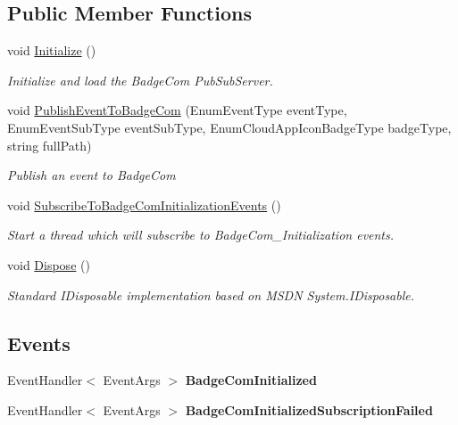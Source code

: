 \subsection*{Public Member Functions}
\begin{DoxyCompactItemize}
\item 
void \hyperlink{class_cloud_api_public_1_1_badge_n_e_t_1_1_badge_com_pub_sub_events_a1db23ca4b59065355bae07fb1754dc3c}{Initialize} ()
\begin{DoxyCompactList}\small\item\em Initialize and load the Badge\-Com Pub\-Sub\-Server. \end{DoxyCompactList}\item 
void \hyperlink{class_cloud_api_public_1_1_badge_n_e_t_1_1_badge_com_pub_sub_events_aff79f63ce7a5015fc8201d2f6c162ec1}{Publish\-Event\-To\-Badge\-Com} (Enum\-Event\-Type event\-Type, Enum\-Event\-Sub\-Type event\-Sub\-Type, Enum\-Cloud\-App\-Icon\-Badge\-Type badge\-Type, string full\-Path)
\begin{DoxyCompactList}\small\item\em Publish an event to Badge\-Com \end{DoxyCompactList}\item 
void \hyperlink{class_cloud_api_public_1_1_badge_n_e_t_1_1_badge_com_pub_sub_events_aa33f0a14fea734e2e82098c0d8972eed}{Subscribe\-To\-Badge\-Com\-Initialization\-Events} ()
\begin{DoxyCompactList}\small\item\em Start a thread which will subscribe to Badge\-Com\-\_\-\-Initialization events. \end{DoxyCompactList}\item 
void \hyperlink{class_cloud_api_public_1_1_badge_n_e_t_1_1_badge_com_pub_sub_events_afd8ebb3dd0bcfa8b9430697c06d9bbfa}{Dispose} ()
\begin{DoxyCompactList}\small\item\em Standard I\-Disposable implementation based on M\-S\-D\-N System.\-I\-Disposable. \end{DoxyCompactList}\end{DoxyCompactItemize}
\subsection*{Events}
\begin{DoxyCompactItemize}
\item 
\hypertarget{class_cloud_api_public_1_1_badge_n_e_t_1_1_badge_com_pub_sub_events_a7d3f740e67bc30875acb4928c9c95f3b}{Event\-Handler$<$ Event\-Args $>$ {\bfseries Badge\-Com\-Initialized}}\label{class_cloud_api_public_1_1_badge_n_e_t_1_1_badge_com_pub_sub_events_a7d3f740e67bc30875acb4928c9c95f3b}

\item 
\hypertarget{class_cloud_api_public_1_1_badge_n_e_t_1_1_badge_com_pub_sub_events_ae968cb36a091f847141f42c312f4c272}{Event\-Handler$<$ Event\-Args $>$ {\bfseries Badge\-Com\-Initialized\-Subscription\-Failed}}\label{class_cloud_api_public_1_1_badge_n_e_t_1_1_badge_com_pub_sub_events_ae968cb36a091f847141f42c312f4c272}

\end{DoxyCompactItemize}


